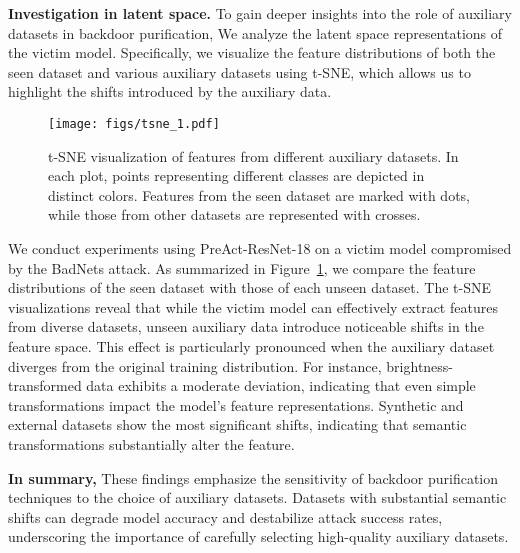 \textbf{Investigation in latent space.} To gain deeper insights into the role of auxiliary datasets in backdoor purification, We analyze the latent space representations of the victim model. Specifically, we visualize the feature distributions of both the seen dataset and various auxiliary datasets using t-SNE, which allows us to highlight the shifts introduced by the auxiliary data.
%
\begin{figure}[h]
    \centering
    \texttt{[image: figs/tsne\_1.pdf]}
    \caption{t-SNE visualization of features from different auxiliary datasets. In each plot, points representing different classes are depicted in distinct colors. Features from the seen dataset are marked with dots, while those from other datasets are represented with crosses.}
    \label{tsnep}
\end{figure}
%
We conduct experiments using PreAct-ResNet-18 on a victim model compromised by the BadNets attack. As summarized in Figure~\ref{tsnep}, we compare the feature distributions of the seen dataset with those of each unseen dataset. The t-SNE visualizations reveal that while the victim model can effectively extract features from diverse datasets, unseen auxiliary data introduce noticeable shifts in the feature space. This effect is particularly pronounced when the auxiliary dataset diverges from the original training distribution. For instance, brightness-transformed data exhibits a moderate deviation, indicating that even simple transformations impact the model’s  feature representations. Synthetic and external datasets show the most significant shifts, indicating that semantic transformations substantially alter the feature.

\textbf{In summary,} These findings emphasize the sensitivity of backdoor purification techniques to the choice of auxiliary datasets. Datasets with substantial semantic shifts can degrade model accuracy and destabilize attack success rates, underscoring the importance of carefully selecting high-quality auxiliary datasets.


